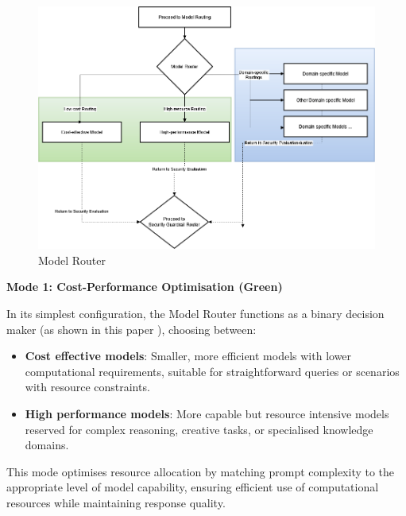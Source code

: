 \begin{figure}[H]
    \centering
    \includegraphics[width=1\textwidth]{figures/model-router.png}
    \caption{Model Router}
    \label{fig:model_router}
\end{figure}


\textbf{Mode 1: Cost-Performance Optimisation (Green)}




In its simplest configuration, the Model Router functions as a binary decision maker (as shown in this paper \cite{lmsysroutellm}), choosing between:

\begin{itemize}
    \item \textbf{Cost effective models}: Smaller, more efficient models with lower computational requirements, suitable for straightforward queries or scenarios with resource constraints.
    \item \textbf{High performance models}: More capable but resource intensive models reserved for complex reasoning, creative tasks, or specialised knowledge domains.
\end{itemize}

This mode optimises resource allocation by matching prompt complexity to the appropriate level of model capability, ensuring efficient use of computational resources while maintaining response quality.

